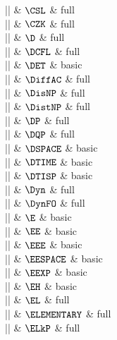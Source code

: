 |\CSL|    & $\CSL$ & full \\

|\CZK|    & $\CZK$ & full \\

|\D|    & $\D$ & full \\

|\DCFL|    & $\DCFL$ & full \\

|\DET|    & $\DET$ & basic \\

|\DiffAC|    & $\DiffAC$ & full \\

|\DisNP|    & $\DisNP$ & full \\

|\DistNP|    & $\DistNP$ & full \\

|\DP|    & $\DP$ & full \\

|\DQP|    & $\DQP$ & full \\

|\DSPACE|    & $\DSPACE$ & basic \\

|\DTIME|    & $\DTIME$ & basic \\

|\DTISP|    & $\DTISP$ & basic \\

|\Dyn|    & $\Dyn$ & full \\

|\DynFO|    & $\DynFO$ & full \\

|\E|    & $\E$ & basic \\

|\EE|    & $\EE$ & basic \\

|\EEE|    & $\EEE$ & basic \\

|\EESPACE|    & $\EESPACE$ & basic \\

|\EEXP|    & $\EEXP$ & basic \\

|\EH|    & $\EH$ & basic \\

|\EL|    & $\EL$ & full \\

|\ELEMENTARY|    & $\ELEMENTARY$ & full \\

|\ELkP|    & $\ELkP$ & full \\

